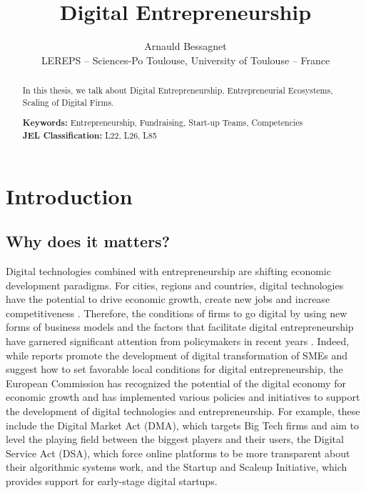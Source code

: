 \documentclass[12pt]{article}
\begin{document}
\title{Digital Entrepreneurship}
\date{\vspace{-3ex}}
\author{Arnauld Bessagnet \\ \footnotesize{LEREPS – Sciences-Po Toulouse, University of Toulouse – France} \\}

\maketitle \vspace{-1,5em}

\begin{abstract}
\noindent
In this thesis, we talk about Digital Entrepreneurship, Entrepreneurial Ecosystems, Scaling of Digital Firms.
\newline

\begin{obeylines}
\noindent \footnotesize{}{\textbf{Keywords:} Entrepreneurship, Fundraising, Start-up Teams, Competencies}
\noindent \footnotesize{\textbf{JEL Classification:} L22, L26, L85}
\end{obeylines}

\end{abstract}

\clearpage
\section{Introduction}

\subsection{Why does it matters?}
Digital technologies combined with entrepreneurship are shifting economic development paradigms. For cities, regions and countries, digital technologies have the potential to drive economic growth, create new jobs and increase competitiveness \citep{autio2016entrepreneurship}. Therefore, the conditions of firms to go digital by using new forms of business models and the factors that facilitate digital entrepreneurship have garnered significant attention from policymakers in recent years \citep{lisbon2016manifesto}. Indeed, while \citet{oecd2021digital, oecd2022scale} reports promote the development of digital transformation of SMEs and suggest how to set favorable local conditions for digital entrepreneurship, the European Commission has recognized the potential of the digital economy for economic growth and has implemented various policies and initiatives to support the development of digital technologies and entrepreneurship. For example, these include the Digital Market Act (DMA), which targets Big Tech firms and aim to level the playing field between the biggest players and their users, the Digital Service Act (DSA), which force online platforms to be more transparent about their algorithmic systems work, and the Startup and Scaleup Initiative, which provides support for early-stage digital startups.
\end{document}
